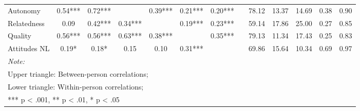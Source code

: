 \begin{table}
\begin{minipage}[t][\textheight][t]{\textwidth}
{\begin{tabular}[t]{lcccccccccccc}
\hspace{1em}Autonomy & 0.54*** & 0.72*** &  & 0.39*** & 0.21*** & 0.20*** &  & 78.12 & 13.37 & 14.69 & 0.38 & 0.90\\
\hspace{1em}Relatedness & 0.09 & 0.42*** & 0.34*** &  & 0.19*** & 0.23*** &  & 59.14 & 17.86 & 25.00 & 0.27 & 0.85\\
\hspace{1em}Quality & 0.56*** & 0.56*** & 0.63*** & 0.38*** &  & 0.35*** &  & 79.13 & 11.34 & 17.43 & 0.25 & 0.83\\
\hspace{1em}Attitudes NL & 0.19* & 0.18* & 0.15 & 0.10 & 0.31*** &  &  & 69.86 & 15.64 & 10.34 & 0.69 & 0.97\\
\bottomrule
\multicolumn{13}{l}{\rule{0pt}{1em}\textit{Note: }}\\
\multicolumn{13}{l}{\rule{0pt}{1em}Upper triangle: Between-person correlations;}\\
\multicolumn{13}{l}{\rule{0pt}{1em}Lower triangle: Within-person correlations;}\\
\multicolumn{13}{l}{\rule{0pt}{1em}*** p < .001, ** p < .01,  * p < .05}\\
\end{tabular}}
\end{minipage}
\end{table}
